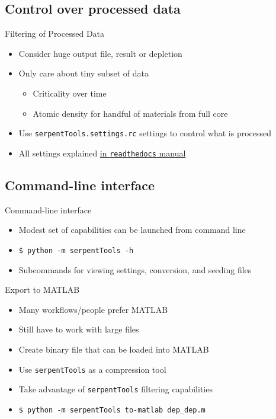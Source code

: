 \documentclass{beamer}
\newcommand{\st}{\texttt{serpentTools} }
\begin{document}
\subsection{Control over processed data}

\begin{frame}{Filtering of Processed Data}
    \begin{itemize}
        \item Consider huge output file, result or depletion
        \item Only care about tiny subset of data
        \begin{itemize}
            \item Criticality over time
            \item Atomic density for handful of materials from full core
        \end{itemize}
        \item Use \texttt{serpentTools.settings.rc} settings to control what is processed
        \item{All settings explained \href{https://serpent-tools.readthedocs.io/en/latest/settingsTop.html}{in \texttt{readthedocs} manual}}
    \end{itemize}
\end{frame}

\subsection{Command-line interface}

\begin{frame}{Command-line interface}
    \begin{itemize}
        \item{Modest set of capabilities can be launched from command line}
        \item{\texttt{\$ python -m serpentTools -h}}
        \item{Subcommands for viewing settings, conversion, and seeding files}
    \end{itemize}
\end{frame}

\begin{frame}{Export to MATLAB}
    \begin{itemize}
        \item Many workflows/people prefer MATLAB
        \item Still have to work with large files
        \item Create binary file that can be loaded into MATLAB
        \item Use \st as a compression tool
        \item Take advantage of \st filtering capabilities
        \item \texttt{\$ python -m serpentTools to-matlab dep\_dep.m}
    \end{itemize}
\end{frame}
\end{document}
